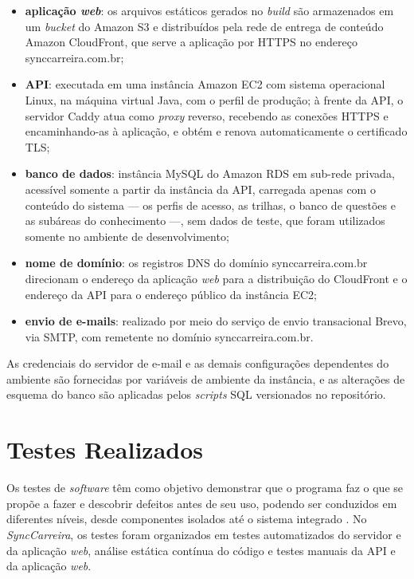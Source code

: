 \begin{itemize}
  \item \textbf{aplicação \textit{web}}: os arquivos estáticos gerados no \textit{build} são armazenados em um \textit{bucket} do Amazon S3 e distribuídos pela rede de entrega de conteúdo Amazon CloudFront, que serve a aplicação por HTTPS no endereço synccarreira.com.br;
  \item \textbf{API}: executada em uma instância Amazon EC2 com sistema operacional Linux, na máquina virtual Java, com o perfil de produção; à frente da API, o servidor Caddy atua como \textit{proxy} reverso, recebendo as conexões HTTPS e encaminhando-as à aplicação, e obtém e renova automaticamente o certificado TLS;
  \item \textbf{banco de dados}: instância MySQL do Amazon RDS em sub-rede privada, acessível somente a partir da instância da API, carregada apenas com o conteúdo do sistema --- os perfis de acesso, as trilhas, o banco de questões e as subáreas do conhecimento ---, sem dados de teste, que foram utilizados somente no ambiente de desenvolvimento;
  \item \textbf{nome de domínio}: os registros DNS do domínio synccarreira.com.br direcionam o endereço da aplicação \textit{web} para a distribuição do CloudFront e o endereço da API para o endereço público da instância EC2;
  \item \textbf{envio de e-mails}: realizado por meio do serviço de envio transacional Brevo, via SMTP, com remetente no domínio synccarreira.com.br.
\end{itemize}

As credenciais do servidor de e-mail e as demais configurações dependentes do ambiente são fornecidas por variáveis de ambiente da instância, e as alterações de esquema do banco são aplicadas pelos \textit{scripts} SQL versionados no repositório.

\section{Testes Realizados}

Os testes de \textit{software} têm como objetivo demonstrar que o programa faz o que se propõe a fazer e descobrir defeitos antes de seu uso, podendo ser conduzidos em diferentes níveis, desde componentes isolados até o sistema integrado \cite{sommerville2011}. No \textit{SyncCarreira}, os testes foram organizados em testes automatizados do servidor e da aplicação \textit{web}, análise estática contínua do código e testes manuais da API e da aplicação \textit{web}.

